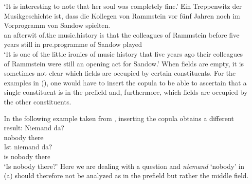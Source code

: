 {\glt `It is interesting to note that her soul was completely fine.'
\ex 
\gll Ein Treppenwitz der Musikgeschichte ist, dass die Kollegen von Rammstein vor fünf Jahren noch im Vorprogramm von Sandow spielten.\\
	 an afterwit of.the music.history is that the colleagues of Rammstein before five years still in pre.programme of Sandow played\\
\glt `It is one of the little ironies of music history that five years ago their colleagues of Rammstein were still an opening act for Sandow.'
\zl
When fields are empty, it is sometimes not clear which fields are occupied by certain constituents. For the examples in (), one would have to
insert the copula to be able to ascertain that a single constituent is in the prefield and, furthermore, which fields are occupied by the other constituents.


In the following example taken from \citet[]{Paul1919a}, inserting the copula obtains a different result: 
\eal
\ex 
\gll Niemand da?\\
	 nobody there\\
\ex 
\gll Ist niemand da?\\
	 is nobody there\\
\glt `Is nobody there?'
\zl
Here we are dealing with a question and \emph{niemand} `nobody' in (a) should therefore not be analyzed as in the prefield but rather the middle field.

}
